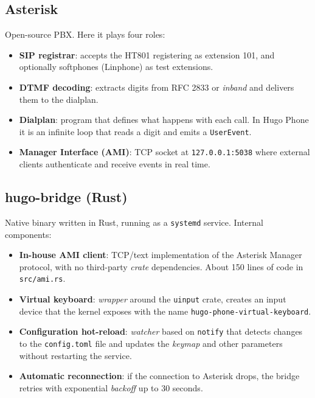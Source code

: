 \subsection{Asterisk}

Open-source PBX. Here it plays four roles:

\begin{itemize}
  \item \textbf{SIP registrar}: accepts the HT801 registering as extension 101, and optionally softphones (Linphone) as test extensions.
  \item \textbf{DTMF decoding}: extracts digits from RFC 2833 or \emph{inband} and delivers them to the dialplan.
  \item \textbf{Dialplan}: program that defines what happens with each call. In Hugo Phone it is an infinite loop that reads a digit and emits a \texttt{UserEvent}.
  \item \textbf{Manager Interface (AMI)}: TCP socket at \texttt{127.0.0.1:5038} where external clients authenticate and receive events in real time.
\end{itemize}

\subsection{hugo-bridge (Rust)}

Native binary written in Rust, running as a \texttt{systemd} service. Internal components:

\begin{itemize}
  \item \textbf{In-house AMI client}: TCP/text implementation of the Asterisk Manager protocol, with no third-party \emph{crate} dependencies. About 150 lines of code in \texttt{src/ami.rs}.
  \item \textbf{Virtual keyboard}: \emph{wrapper} around the \texttt{uinput} crate, creates an input device that the kernel exposes with the name \texttt{hugo-phone-virtual-keyboard}.
  \item \textbf{Configuration hot-reload}: \emph{watcher} based on \texttt{notify} that detects changes to the \texttt{config.toml} file and updates the \emph{keymap} and other parameters without restarting the service.
  \item \textbf{Automatic reconnection}: if the connection to Asterisk drops, the bridge retries with exponential \emph{backoff} up to 30 seconds.
\end{itemize}

